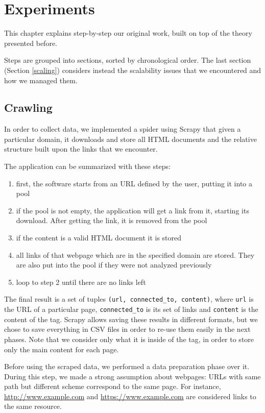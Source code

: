 \chapter{Experiments} \label{experiments}
This chapter explains step-by-step our original work, built on top of the theory presented before.

Steps are grouped into sections, sorted by chronological order.
The last section (Section \ref{scaling}) considers instead the scalability issues that we encountered and how we managed them.



\section{Crawling} \label{crawling}
In order to collect data, 
we implemented a spider using Scrapy that given a particular domain, it downloads and store all HTML documents 
and the relative structure built upon the links that we encounter.

The application can be summarized with these steps:
\begin{enumerate}
    \item first, the software starts from an URL defined by the user, putting it into a pool
    \item if the pool is not empty, the application will get a link from it, starting its download. After getting the link, it is removed from the pool
    \item if the content is a valid HTML document it is stored
    \item all links of that webpage which are in the specified domain are stored. They are also put into the pool if they were not analyzed previously
    \item loop to step 2 until there are no links left
\end{enumerate}

The final result is a set of tuples \texttt{(url, connected\_to, content)}, where \texttt{url} is the URL of a particular page, \texttt{connected\_to} is its set of links and \texttt{content} is the content of the  tag.
Scrapy allows saving these results in different formats, but we chose to save everything in CSV files in order to re-use them easily in the next phases.
Note that we consider only what it is inside of the  tag, in order to store only the main content for each page.

Before using the scraped data, we performed a data preparation phase over it.
During this step, we made a strong assumption about webpages: 
URLs with same path but different scheme correspond to the same page. 
For instance, \url{http://www.example.com} and \url{https://www.example.com}
are considered links to the same resource. 

